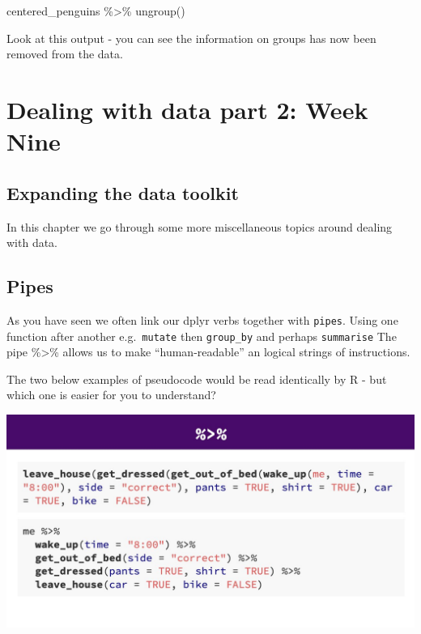 \documentclass[
]{book}
\newenvironment{Shaded}{\begin{snugshade}}{\end{snugshade}}
\newcommand{\FunctionTok}[1]{\textcolor[rgb]{0.00,0.00,0.00}{#1}}
\newcommand{\NormalTok}[1]{#1}
\newcommand{\SpecialCharTok}[1]{\textcolor[rgb]{0.00,0.00,0.00}{#1}}
\begin{document}
\begin{Shaded}
\begin{Highlighting}[]
\NormalTok{centered\_penguins }\SpecialCharTok{\%\textgreater{}\%} 
  \FunctionTok{ungroup}\NormalTok{()}
\end{Highlighting}
\end{Shaded}

Look at this output - you can see the information on groups has now been removed from the data.

\hypertarget{dealing-with-data-part-2-week-nine}{%
\chapter{Dealing with data part 2: Week Nine}\label{dealing-with-data-part-2-week-nine}}

\hypertarget{expanding-the-data-toolkit}{%
\section{Expanding the data toolkit}\label{expanding-the-data-toolkit}}

In this chapter we go through some more miscellaneous topics around dealing with data.

\hypertarget{pipes}{%
\section{Pipes}\label{pipes}}

As you have seen we often link our dplyr verbs together with \texttt{pipes}. Using one function after another e.g.~\texttt{mutate} then \texttt{group\_by} and perhaps \texttt{summarise}
The pipe \%\textgreater\% allows us to make ``human-readable'' an logical strings of instructions.

The two below examples of pseudocode would be read identically by R - but which one is easier for you to understand?

\includegraphics[width=0.8\linewidth]{images/pipe}
\end{document}
